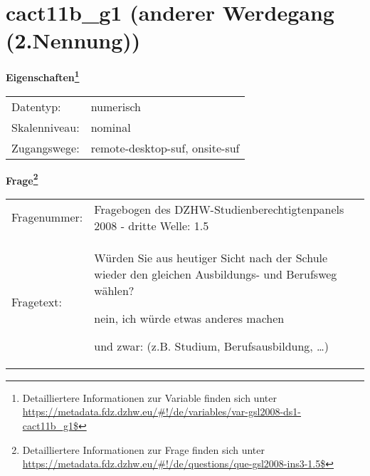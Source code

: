 
    \setcounter{footnote}{0}

    \vspace*{-1.8cm}
	\section{cact11b\_g1 (anderer Werdegang (2.Nennung))}
	\label{section:cact11b_g1}



    \vspace*{0.5cm}
    \noindent\textbf{Eigenschaften\footnote{Detailliertere Informationen zur Variable finden sich unter
		\url{https://metadata.fdz.dzhw.eu/\#!/de/variables/var-gsl2008-ds1-cact11b_g1$}}}\\
	\begin{tabularx}{\hsize}{@{}lX}
	Datentyp: & numerisch \\
	Skalenniveau: & nominal \\
	Zugangswege: &
	  remote-desktop-suf, 
	  onsite-suf
 \\
    \end{tabularx}



				\vspace*{0.5cm}
                \noindent\textbf{Frage\footnote{Detailliertere Informationen zur Frage finden sich unter
		              \url{https://metadata.fdz.dzhw.eu/\#!/de/questions/que-gsl2008-ins3-1.5$}}}\\
				\begin{tabularx}{\hsize}{@{}lX}
					Fragenummer: &
					  Fragebogen des DZHW-Studienberechtigtenpanels 2008 - dritte Welle:
					  1.5
 \\
					Fragetext: & Würden Sie aus heutiger Sicht nach der Schule wieder den gleichen Ausbildungs- und Berufsweg wählen?\par  nein, ich würde etwas anderes machen\par  und zwar: (z.B. Studium, Berufsausbildung, …) \\
				\end{tabularx}





